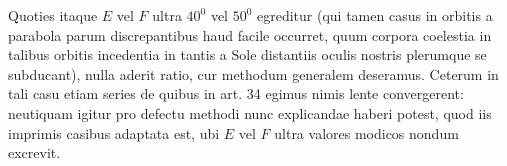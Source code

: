 \noindent Quoties itaque $E$ vel $F$ ultra $40^0$ vel $50^0$ egreditur (qui tamen casus in orbitis a parabola parum discrepantibus haud facile occurret, quum corpora coelestia in talibus orbitis incedentia in tantis a Sole distantiis oculis nostris plerumque se subducant), nulla aderit ratio, cur methodum generalem deseramus. Ceterum in tali casu etiam series de quibus in art. 34 egimus nimis lente convergerent: neutiquam igitur pro defectu methodi nunc explicandae haberi potest, quod iis imprimis casibus adaptata est, ubi $E$ vel $F$ ultra valores modicos nondum excrevit.
